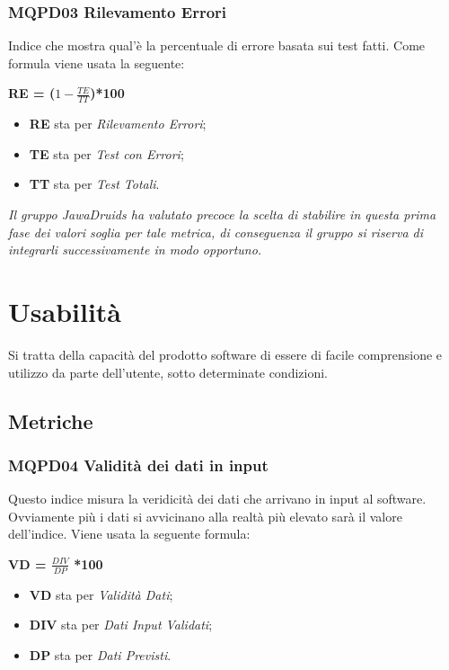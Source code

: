 \subsubsection{MQPD03 Rilevamento Errori} \label{QualitàDelProdottoAffidabilitàMetricheMQPD03}
Indice che mostra qual’è la percentuale di errore basata sui test fatti. Come formula viene usata la seguente:
\begin{center}
	\textbf{RE = ($1-\frac{TE}{TT}$)*100}
\end{center}
\begin{itemize}
	\item \textbf{RE} sta per \textit{Rilevamento Errori};
	\item \textbf{TE} sta per \textit{Test con Errori};
	\item \textbf{TT} sta per \textit{Test Totali}.
\end{itemize}
\textit{Il gruppo JawaDruids ha valutato precoce la scelta di stabilire in questa prima fase dei valori soglia per tale metrica, di conseguenza il gruppo si riserva di integrarli successivamente in modo opportuno.}

\section{Usabilità}\label{QualitàDelProdottoUsabilità}
Si tratta della capacità del prodotto software di essere di facile comprensione e utilizzo da parte dell’utente, sotto determinate condizioni. 
\subsection{Metriche} \label{QualitàDelProdottoUsabilitàMetriche}
\subsubsection{MQPD04 Validità dei dati in input} \label{QualitàDelProdottoUsabilitàMetricheMQPD04}
Questo indice misura la veridicità dei dati che arrivano in input al software. Ovviamente più i dati si avvicinano alla realtà più elevato sarà il valore dell’indice.
Viene usata la seguente formula:
\begin{center}
	\textbf{VD = $\frac{DIV}{DP}$ *100}
\end{center}
\begin{itemize}
	\item \textbf{VD} sta per \textit{Validità Dati};
	\item \textbf{DIV} sta per \textit{Dati Input Validati};
	\item \textbf{DP} sta per \textit{Dati Previsti}.
\end{itemize}

